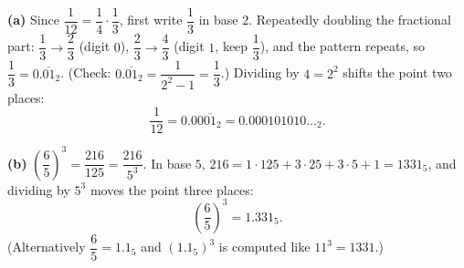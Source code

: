 \textbf{(a)} Since $\dfrac{1}{12}=\dfrac{1}{4}\cdot\dfrac{1}{3}$, first write $\dfrac{1}{3}$ in base $2$. Repeatedly doubling the fractional part: $\dfrac{1}{3}\to\dfrac{2}{3}$ (digit $0$), $\dfrac{2}{3}\to\dfrac{4}{3}$ (digit $1$, keep $\dfrac{1}{3}$), and the pattern repeats, so $\dfrac{1}{3}=0.\overline{01}_2$. (Check: $0.\overline{01}_2=\dfrac{1}{2^2-1}=\dfrac{1}{3}$.) Dividing by $4=2^2$ shifts the point two places:
\[\dfrac{1}{12}=\boxed{0.00\overline{01}_2}=0.000101010\ldots_2.\]

\textbf{(b)} $\left(\dfrac{6}{5}\right)^3=\dfrac{216}{125}=\dfrac{216}{5^3}$. In base $5$, $216=1\cdot125+3\cdot25+3\cdot5+1=1331_5$, and dividing by $5^3$ moves the point three places:
\[\left(\dfrac{6}{5}\right)^3=\boxed{1.331_5}.\]
(Alternatively $\dfrac{6}{5}=1.1_5$ and $(1.1_5)^3$ is computed like $11^3=1331$.)

